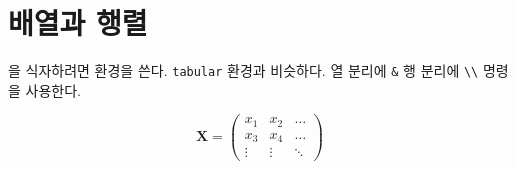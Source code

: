 \section{배열과 행렬}
\label{sec:arraymat}

을 식자하려면  환경을 쓴다.
\texttt{tabular} 환경과 비슷하다. 
열 분리에 \verb|&| 행 분리에 \verb|\\| 명령을 사용한다.
\begin{example}
  \begin{equation*}
    \mathbf{X} = \left( 
      \begin{array}{ccc}
        x_1 & x_2 & \ldots \\
        x_3 & x_4 & \ldots \\
        \vdots & \vdots & \ddots
      \end{array} \right)
  \end{equation*}
\end{example}

